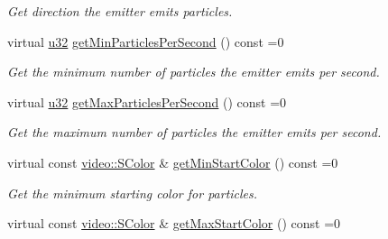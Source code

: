 \begin{DoxyCompactItemize}
\begin{DoxyCompactList}\small\item\em Get direction the emitter emits particles. \end{DoxyCompactList}\item 
\mbox{\label{classirr_1_1scene_1_1IParticleEmitter_a375f9a3b4d462e55d503a6db58a76717}} 
virtual \hyperlink{namespaceirr_a0416a53257075833e7002efd0a18e804}{u32} \hyperlink{classirr_1_1scene_1_1IParticleEmitter_a375f9a3b4d462e55d503a6db58a76717}{get\+Min\+Particles\+Per\+Second} () const =0
\begin{DoxyCompactList}\small\item\em Get the minimum number of particles the emitter emits per second. \end{DoxyCompactList}\item 
\mbox{\label{classirr_1_1scene_1_1IParticleEmitter_afd04037b5e4988e053d7d9bf17817cd7}} 
virtual \hyperlink{namespaceirr_a0416a53257075833e7002efd0a18e804}{u32} \hyperlink{classirr_1_1scene_1_1IParticleEmitter_afd04037b5e4988e053d7d9bf17817cd7}{get\+Max\+Particles\+Per\+Second} () const =0
\begin{DoxyCompactList}\small\item\em Get the maximum number of particles the emitter emits per second. \end{DoxyCompactList}\item 
\mbox{\label{classirr_1_1scene_1_1IParticleEmitter_a919f23add74b59c88a6c72b417d187e2}} 
virtual const \hyperlink{classirr_1_1video_1_1SColor}{video\+::\+S\+Color} \& \hyperlink{classirr_1_1scene_1_1IParticleEmitter_a919f23add74b59c88a6c72b417d187e2}{get\+Min\+Start\+Color} () const =0
\begin{DoxyCompactList}\small\item\em Get the minimum starting color for particles. \end{DoxyCompactList}\item 
\mbox{\label{classirr_1_1scene_1_1IParticleEmitter_a898736e31071bb5bfdb806e4c892eb01}} 
virtual const \hyperlink{classirr_1_1video_1_1SColor}{video\+::\+S\+Color} \& \hyperlink{classirr_1_1scene_1_1IParticleEmitter_a898736e31071bb5bfdb806e4c892eb01}{get\+Max\+Start\+Color} () const =0

\end{DoxyCompactItemize}
